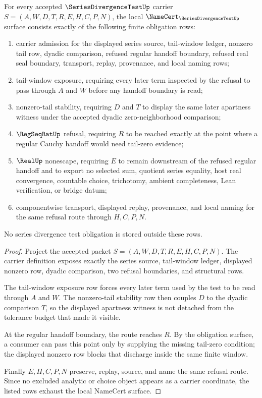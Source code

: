 \begin{theorem}\label{thm:series-divergence-test-namecert-obligations}
For every accepted $\SeriesDivergenceTestUp$ carrier $S=(A,W,D,T,R,E,H,C,P,N)$, the local $\NameCert_{\SeriesDivergenceTestUp}$ surface consists exactly of the following finite obligation rows:
\begin{enumerate}
\item carrier admission for the displayed series source, tail-window ledger, nonzero tail row, dyadic comparison, refused regular handoff boundary, refused real seal boundary, transport, replay, provenance, and local naming rows;
\item tail-window exposure, requiring every later term inspected by the refusal to pass through $A$ and $W$ before any handoff boundary is read;
\item nonzero-tail stability, requiring $D$ and $T$ to display the same later apartness witness under the accepted dyadic zero-neighborhood comparison;
\item $\RegSeqRatUp$ refusal, requiring $R$ to be reached exactly at the point where a regular Cauchy handoff would need tail-zero evidence;
\item $\RealUp$ nonescape, requiring $E$ to remain downstream of the refused regular handoff and to export no selected sum, quotient series equality, host real convergence, countable choice, trichotomy, ambient completeness, Lean verification, or bridge datum;
\item componentwise transport, displayed replay, provenance, and local naming for the same refusal route through $H,C,P,N$.
\end{enumerate}
No series divergence test obligation is stored outside these rows.
\end{theorem}
\begin{proof}
Project the accepted packet $S=(A,W,D,T,R,E,H,C,P,N)$. The carrier definition exposes exactly the series source, tail-window ledger, displayed nonzero row, dyadic comparison, two refusal boundaries, and structural rows.

The tail-window exposure row forces every later term used by the test to be read through $A$ and $W$. The nonzero-tail stability row then couples $D$ to the dyadic comparison $T$, so the displayed apartness witness is not detached from the tolerance budget that made it visible.

At the regular handoff boundary, the route reaches $R$. By the obligation surface, a consumer can pass this point only by supplying the missing tail-zero condition; the displayed nonzero row blocks that discharge inside the same finite window.

Finally $E,H,C,P,N$ preserve, replay, source, and name the same refusal route. Since no excluded analytic or choice object appears as a carrier coordinate, the listed rows exhaust the local NameCert surface.
\end{proof}

